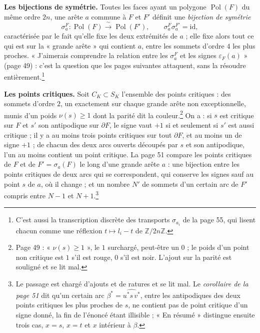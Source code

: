\documentclass[11pt,a4paper]{article}
\begin{document}
\textbf{Les bijections de symétrie.} Toutes les faces ayant un polygone
$\operatorname{Pol}(F)$ du même ordre $2n$, une arête $a$ commune à $F$ et $F'$
définit une \emph{bijection de symétrie}
\[
\sigma_a^F : \operatorname{Pol}(F) \xrightarrow{\ \sim\ } \operatorname{Pol}(F'),
\qquad \sigma_a^F \sigma_a^{F'} = \mathrm{id},
\]
caractérisée par le fait qu'elle fixe les deux extrémités de $a$ ; elle fixe
alors tout ce qui est sur la « grande arête » qui contient $a$, entre les
sommets d'ordre $4$ les plus proches. « J'aimerais comprendre la relation entre
les $\sigma_a^F$ et les signes $\varepsilon_F(a)$ » (page 49) : c'est la
question que les pages suivantes attaquent, sans la résoudre
entièrement.\footnote{C'est aussi la transcription discrète des transports
$\sigma_{a_i}$ de la page 55, qui lisent chacun comme une réflexion
$t \mapsto l_i - t$ de $\mathbb{Z}/2n\mathbb{Z}$.}

\textbf{Les points critiques.} Soit $C_K \subset S_K$ l'ensemble des points
critiques : des sommets d'ordre $2$, un exactement sur chaque grande arête non
exceptionnelle, munis d'un poids $\nu(s) \geqslant 1$ dont la parité dit la
couleur.\footnote{Page 49 : « $\nu(s) \geqslant 1$ », le $1$ surchargé,
peut-être un $0$ ; le poids d'un point non critique est $1$ s'il est rouge, $0$
s'il est noir. L'ajout sur la parité est souligné et se lit mal.} On a : si $s$
est critique sur $F$ et $s'$ son antipodique sur $\partial F$, le signe vaut
$+1$ si et seulement si $s'$ est aussi critique ; il y a au moins trois points
critiques sur tout $\partial F$, et au moins un de signe $+1$ ; de chacun des
deux arcs ouverts découpés par $s$ et son antipodique, l'un au moins contient un
point critique. La page 51 compare les points critiques de $F$ et de $F' =
\sigma_a(F)$ le long d'une grande arête $a$ : une bijection entre les points
critiques de deux arcs qui se correspondent, qui conserve les signes sauf au
point $s$ de $a$, où il change ; et un nombre $N'$ de sommets d'un certain arc
de $F'$ compris entre $N - 1$ et $N + 1$.\footnote{Le passage est chargé
d'ajouts et de ratures et se lit mal. Le \emph{corollaire de la page 51} dit
qu'un certain arc $\beta^{*} = \widehat{u^{*} s\, v^{*}}$, entre les
antipodiques des deux points critiques les plus proches de $s$, ne contient pas
de point critique d'un signe donné, la fin de l'énoncé étant illisible ;
« En résumé » distingue ensuite trois cas, $x = s$, $x = t$ et $x$ intérieur à
$\beta$.}
\end{document}
